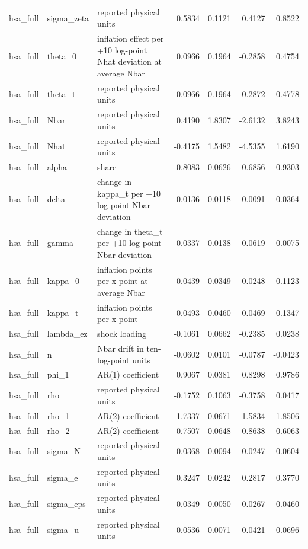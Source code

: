 \begin{tabular}{lllrrrr}
hsa\_full & sigma\_zeta & reported physical units & 0.5834 & 0.1121 & 0.4127 & 0.8522 \\
hsa\_full & theta\_0 & inflation effect per +10 log-point Nhat deviation at average Nbar & 0.0966 & 0.1964 & -0.2858 & 0.4754 \\
hsa\_full & theta\_t & reported physical units & 0.0966 & 0.1964 & -0.2872 & 0.4778 \\
hsa\_full & Nbar & reported physical units & 0.4190 & 1.8307 & -2.6132 & 3.8243 \\
hsa\_full & Nhat & reported physical units & -0.4175 & 1.5482 & -4.5355 & 1.6190 \\
hsa\_full & alpha & share & 0.8083 & 0.0626 & 0.6856 & 0.9303 \\
hsa\_full & delta & change in kappa\_t per +10 log-point Nbar deviation & 0.0136 & 0.0118 & -0.0091 & 0.0364 \\
hsa\_full & gamma & change in theta\_t per +10 log-point Nbar deviation & -0.0337 & 0.0138 & -0.0619 & -0.0075 \\
hsa\_full & kappa\_0 & inflation points per x point at average Nbar & 0.0439 & 0.0349 & -0.0248 & 0.1123 \\
hsa\_full & kappa\_t & inflation points per x point & 0.0493 & 0.0460 & -0.0469 & 0.1347 \\
hsa\_full & lambda\_ez & shock loading & -0.1061 & 0.0662 & -0.2385 & 0.0238 \\
hsa\_full & n & Nbar drift in ten-log-point units & -0.0602 & 0.0101 & -0.0787 & -0.0423 \\
hsa\_full & phi\_1 & AR(1) coefficient & 0.9067 & 0.0381 & 0.8298 & 0.9786 \\
hsa\_full & rho & reported physical units & -0.1752 & 0.1063 & -0.3758 & 0.0417 \\
hsa\_full & rho\_1 & AR(2) coefficient & 1.7337 & 0.0671 & 1.5834 & 1.8506 \\
hsa\_full & rho\_2 & AR(2) coefficient & -0.7507 & 0.0648 & -0.8638 & -0.6063 \\
hsa\_full & sigma\_N & reported physical units & 0.0368 & 0.0094 & 0.0247 & 0.0604 \\
hsa\_full & sigma\_e & reported physical units & 0.3247 & 0.0242 & 0.2817 & 0.3770 \\
hsa\_full & sigma\_eps & reported physical units & 0.0349 & 0.0050 & 0.0267 & 0.0460 \\
hsa\_full & sigma\_u & reported physical units & 0.0536 & 0.0071 & 0.0421 & 0.0696 \\

\end{tabular}
